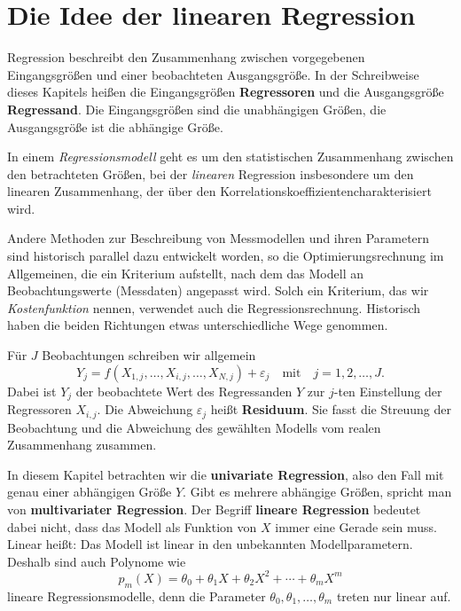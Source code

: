 \section{Die Idee der linearen Regression}
\label{RegressionsIdee}
%

Regression beschreibt den Zusammenhang zwischen vorgegebenen Eingangsgrößen und einer beobachteten Ausgangsgröße. In der Schreibweise dieses Kapitels heißen die Eingangsgrößen \textbf{Regressoren} und die Ausgangsgröße \textbf{Regressand}. Die Eingangsgrößen sind die unabhängigen Größen, die Ausgangsgröße ist die abhängige Größe.

In einem \textsl{Regressionsmodell} geht es um den statistischen Zusammenhang zwischen den betrachteten Größen, bei der \emph{linearen} Regression insbesondere um den linearen Zusammenhang, der über den Korrelationskoeffizientencharakterisiert wird.

Andere Methoden zur Beschreibung von Messmodellen und ihren Parametern sind historisch parallel dazu entwickelt worden, so die Optimierungsrechnung im Allgemeinen, die ein Kriterium aufstellt, nach dem das Modell an Beobachtungswerte (Messdaten) angepasst wird. Solch ein Kriterium, das wir \textsl{Kostenfunktion} nennen, verwendet auch die Regressionsrechnung. Historisch haben die beiden Richtungen etwas unterschiedliche Wege genommen.

Für $J$ Beobachtungen schreiben wir allgemein
\begin{equation}
Y_j = f(X_{1,j},\dots, X_{i,j},\dots, X_{N,j}) + \varepsilon_j
\quad \mathrm{mit} \quad j = 1,2,\ldots,J .
\label{Kap2Modellglunivar}
\end{equation}
Dabei ist $Y_j$ der beobachtete Wert des Regressanden $Y$ zur $j$-ten Einstellung der Regressoren $X_{i,j}$. Die Abweichung $\varepsilon_j$ heißt \textbf{Residuum}. Sie fasst die Streuung der Beobachtung und die Abweichung des gewählten Modells vom realen Zusammenhang zusammen.

In diesem Kapitel betrachten wir die \textbf{univariate Regression}, also den Fall mit genau einer abhängigen Größe $Y$. Gibt es mehrere abhängige Größen, spricht man von \textbf{multivariater Regression}. Der Begriff \textbf{lineare Regression} bedeutet dabei nicht, dass das Modell als Funktion von $X$ immer eine Gerade sein muss. Linear heißt: Das Modell ist linear in den unbekannten Modellparametern. Deshalb sind auch Polynome wie
\begin{equation}
p_m(X) = \theta_0 + \theta_1 X + \theta_2 X^2 + \cdots + \theta_m X^m
\label{potenzgesetzlinReg}
\end{equation}
lineare Regressionsmodelle, denn die Parameter $\theta_0,\theta_1,\ldots,\theta_m$ treten nur linear auf.

